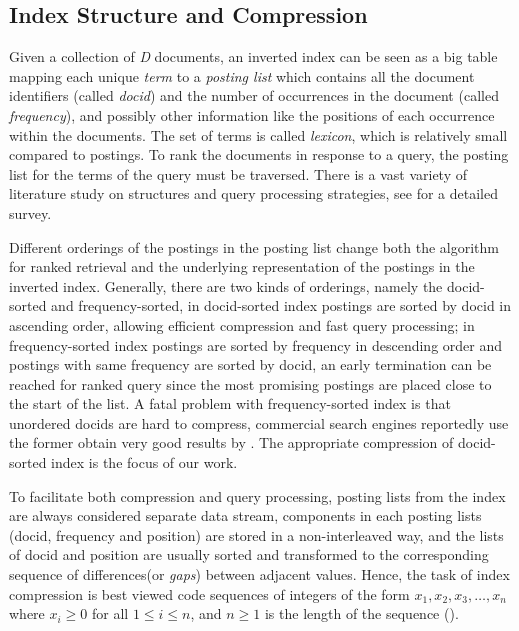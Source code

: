 \documentclass{sig-alternate-05-2015}
\begin{document}
\subsection{Index Structure and Compression}
Given a collection of \textit{D} documents, an inverted index can be seen as a big table mapping each unique \textit{term} to a\textit{ posting list} which contains all the document identifiers (called \textit{docid}) and the number of occurrences in the document (called \textit{frequency}), and possibly other information like the positions of each occurrence within the documents.
The set of terms is called \textit{lexicon}, which is relatively small compared to postings.
To rank the documents in response to a query, the posting list for the terms of the query must be traversed.
There is a vast variety of literature study on structures and query processing strategies, see \cite{ding2011faster,navarro2010dual} for a detailed survey.

Different orderings of the postings in the posting list change both the algorithm for ranked retrieval and the underlying representation of the postings in the inverted index.
Generally, there are two kinds of orderings, namely the docid-sorted and frequency-sorted, in docid-sorted index postings are sorted by docid in ascending order, allowing efficient compression and fast query processing; in frequency-sorted index postings are sorted by frequency in descending order and postings with same frequency are sorted by docid, an early termination can be reached for ranked query since the most promising postings are placed close to the start of the list.
A fatal problem with frequency-sorted index is that unordered docids are hard to compress, commercial search engines reportedly use the former obtain very good results by \cite{dimopoulos2013optimizing}.
The appropriate compression of docid-sorted index is the focus of our work.

To facilitate both compression and query processing, posting lists from the index are always considered separate data stream, components in each posting lists (docid, frequency and position) are stored in a non-interleaved way, and the lists of docid and position are usually sorted and transformed to the corresponding sequence of differences(or \textit{gaps}) between adjacent values.
Hence, the task of index compression is best viewed code sequences of integers of the form $x_{1},x_{2},x_{3},\ldots,x_{n}$ where $x_{i}\geqslant0$ for all $1\leqslant i\leqslant n$, and $n\geqslant1$ is the length of the sequence (\cite{anh2010index}).
\end{document}
